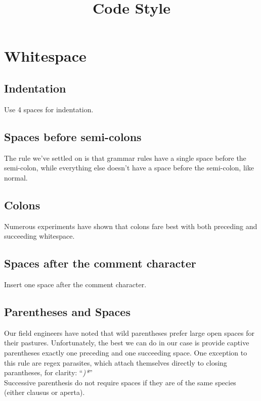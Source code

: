 \documentclass[12pt, notitlepage]{article}
\begin{document}
\title{Code Style}\author{}\date{}\maketitle

\section{Whitespace}

\subsection{Indentation}
Use 4 spaces for indentation.

\subsection{Spaces before semi-colons}
The rule we've settled on is that grammar rules have a single space before the semi-colon, while everything else doesn't have a space before the semi-colon, like normal.

\subsection{Colons}
Numerous experiments have shown that colons fare best with both preceding and succeeding whitespace.

\subsection{Spaces after the comment character}
Insert one space after the comment character.

\subsection{Parentheses and Spaces}
Our field engineers have noted that wild parentheses prefer large open spaces for their pastures.
Unfortunately, the best we can do in our case is provide captive parentheses exactly one preceding and one succeeding space.
One exception to this rule are regex parasites, which attach themselves directly to closing parantheses, for clarity: ``\textit{)*}''\\
Successive parenthesis do not require spaces if they are of the same species (either clausus or aperta).
\end{document}

